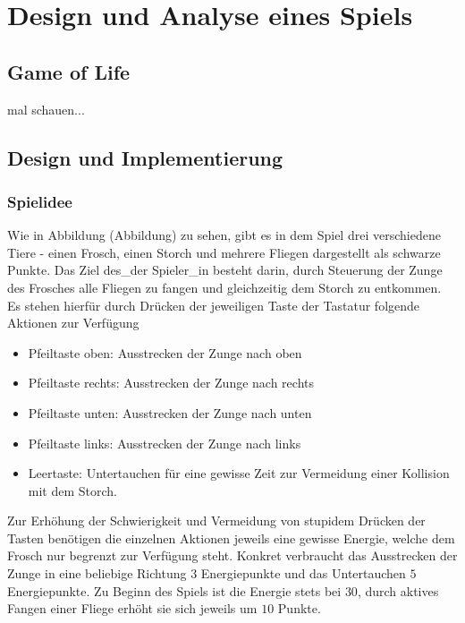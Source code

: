 \chapter{Design und Analyse eines Spiels}
\label{chapter:game}

\section{Game of Life}

mal schauen...

\section{Design und Implementierung}

\subsection{Spielidee}

Wie in Abbildung (Abbildung) zu sehen, gibt es in dem Spiel drei verschiedene Tiere - einen Frosch, einen Storch und mehrere Fliegen dargestellt als schwarze Punkte. Das Ziel des\_der Spieler\_in besteht darin, durch Steuerung der Zunge des Frosches alle Fliegen zu fangen und gleichzeitig dem Storch zu entkommen. Es stehen hierfür durch Drücken der jeweiligen Taste der Tastatur folgende Aktionen zur Verfügung
\begin{itemize}
  \item Pfeiltaste oben: Ausstrecken der Zunge nach oben
  \item Pfeiltaste rechts: Ausstrecken der Zunge nach rechts
  \item Pfeiltaste unten: Ausstrecken der Zunge nach unten
  \item Pfeiltaste links: Ausstrecken der Zunge nach links
  \item Leertaste: Untertauchen für eine gewisse Zeit zur Vermeidung einer Kollision mit dem Storch.
\end{itemize}

Zur Erhöhung der Schwierigkeit und Vermeidung von stupidem Drücken der Tasten benötigen die einzelnen Aktionen jeweils eine gewisse Energie, welche dem Frosch nur begrenzt zur Verfügung steht. Konkret verbraucht das Ausstrecken der Zunge in eine beliebige Richtung $3$ Energiepunkte und das Untertauchen $5$ Energiepunkte. Zu Beginn des Spiels ist die Energie stets bei $30$, durch aktives Fangen einer Fliege erhöht sie sich jeweils um $10$ Punkte.

